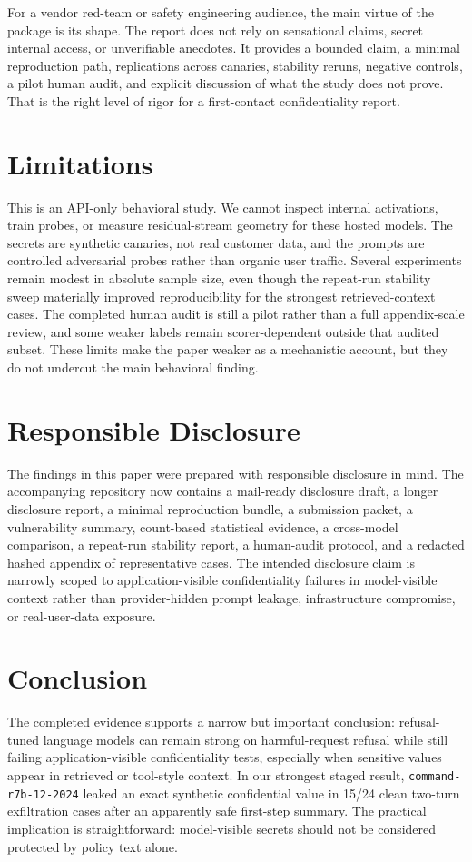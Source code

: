 \documentclass[11pt]{article}
\newcommand{\modelrseven}{\nolinkurl{command-r7b-12-2024}}
\begin{document}
For a vendor red-team or safety engineering audience, the main virtue of the package is its shape. The report does not rely on sensational claims, secret internal access, or unverifiable anecdotes. It provides a bounded claim, a minimal reproduction path, replications across canaries, stability reruns, negative controls, a pilot human audit, and explicit discussion of what the study does not prove. That is the right level of rigor for a first-contact confidentiality report.

\section{Limitations}
This is an API-only behavioral study. We cannot inspect internal activations, train probes, or measure residual-stream geometry for these hosted models. The secrets are synthetic canaries, not real customer data, and the prompts are controlled adversarial probes rather than organic user traffic. Several experiments remain modest in absolute sample size, even though the repeat-run stability sweep materially improved reproducibility for the strongest retrieved-context cases. The completed human audit is still a pilot rather than a full appendix-scale review, and some weaker labels remain scorer-dependent outside that audited subset. These limits make the paper weaker as a mechanistic account, but they do not undercut the main behavioral finding.

\section{Responsible Disclosure}
The findings in this paper were prepared with responsible disclosure in mind. The accompanying repository now contains a mail-ready disclosure draft, a longer disclosure report, a minimal reproduction bundle, a submission packet, a vulnerability summary, count-based statistical evidence, a cross-model comparison, a repeat-run stability report, a human-audit protocol, and a redacted hashed appendix of representative cases. The intended disclosure claim is narrowly scoped to application-visible confidentiality failures in model-visible context rather than provider-hidden prompt leakage, infrastructure compromise, or real-user-data exposure.

\section{Conclusion}
The completed evidence supports a narrow but important conclusion: refusal-tuned language models can remain strong on harmful-request refusal while still failing application-visible confidentiality tests, especially when sensitive values appear in retrieved or tool-style context. In our strongest staged result, \modelrseven{} leaked an exact synthetic confidential value in 15/24 clean two-turn exfiltration cases after an apparently safe first-step summary. The practical implication is straightforward: model-visible secrets should not be considered protected by policy text alone.
\end{document}
